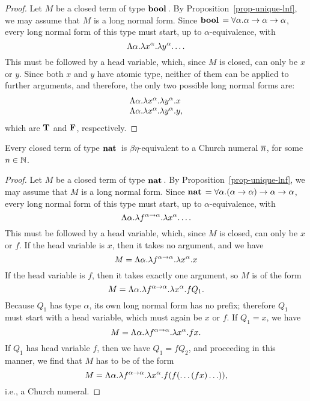 \documentclass{article}
\begin{document}
\begin{proof}
  Let $M$ be a closed term of type $\mathop{\textbf{\bf bool}\,}$. By
  Proposition~\ref{prop-unique-lnf}, we may assume that $M$ is a long
  normal form. Since $\mathop{\textbf{\bf bool}\,} = \forall\alpha.\alpha\to\alpha\to\alpha$,
  every long normal form of this type must start, up to
  $\alpha$-equivalence, with
  \[ \Lambda\alpha.\lambda x^{\alpha}.\lambda y^{\alpha}.\ldots
  \]
  This must be followed by a head variable, which, since $M$ is
  closed, can only be $x$ or $y$. Since both $x$ and $y$ have atomic
  type, neither of them can be applied to further arguments, and
  therefore, the only two possible long normal forms are:
  \[ \begin{array}{l}
    \Lambda\alpha.\lambda x^{\alpha}.\lambda y^{\alpha}.x \\
    \Lambda\alpha.\lambda x^{\alpha}.\lambda y^{\alpha}.y,
  \end{array}
  \]
  which are ${\bf T}$ and ${\bf F}$, respectively.\eot
\end{proof}

\begin{proposition}\label{prop-unique-nat}
  Every closed term of type $\mathop{\textbf{\bf nat}\,}$ is $\beta\eta$-equivalent to a
  Church numeral $\mathop{\overline{n}}$, for some $n\in\mathbb{N}$.
\end{proposition}

\begin{proof}
  Let $M$ be a closed term of type $\mathop{\textbf{\bf nat}\,}$. By
  Proposition~\ref{prop-unique-lnf}, we may assume that $M$ is a long
  normal form. Since
  $\mathop{\textbf{\bf nat}\,}=\forall\alpha.(\alpha\to\alpha)\to\alpha\to\alpha$, every long
  normal form of this type must start, up to $\alpha$-equivalence,
  with
  \[
  \Lambda\alpha.\lambda f^{\alpha\to\alpha}.\lambda x^{\alpha}.\ldots
  \]
  This must be followed by a head variable, which, since $M$ is
  closed, can only be $x$ or $f$. If the head variable is $x$, then it
  takes no argument, and we have 
  \[ M = \Lambda\alpha.\lambda f^{\alpha\to\alpha}.\lambda x^{\alpha}.x
  \]
  If the head variable is $f$, then it takes exactly one argument, so
  $M$ is of the form
  \[ M = \Lambda\alpha.\lambda f^{\alpha\to\alpha}.\lambda x^{\alpha}.fQ_1.
  \]
  Because $Q_1$ has type $\alpha$, its own long normal form has no
  prefix; therefore $Q_1$ must start with a head variable, which must
  again be $x$ or $f$. If $Q_1=x$, we have
  \[ M = \Lambda\alpha.\lambda f^{\alpha\to\alpha}.\lambda x^{\alpha}.fx.
  \]
  If $Q_1$ has head variable $f$, then we have $Q_1=fQ_2$, and
  proceeding in this manner, we find that $M$ has to be of the form
  \[ M =
  \Lambda\alpha.\lambda f^{\alpha\to\alpha}.\lambda x^{\alpha}.f(f(\ldots(fx)\ldots)),
  \]
  i.e., a Church numeral.\eot
\end{proof}
\end{document}
